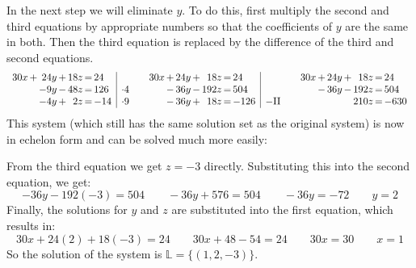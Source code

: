 \documentclass[12pt,eng]{skript_ogg}
\begin{document}
\begin{beispiel}
In the next step we will eliminate $y$. To do this, first multiply the second and third equations by appropriate numbers so that the coefficients of $y$ are the same in both. Then the third equation is replaced by the difference of the third and second equations.		
\[\begin{array}{r@{\,}c@{\,}r@{\,}c@{\,}r@{\,}c@{\,}l|l}
30x & + & 24y & + & 18z & = & 24 &\\
    &   & -9y & - & 48z & = & 126 & \cdot 4\\
    &   & -4y & + & 2z  & = & -14 & \cdot 9
\end{array}\quad\begin{array}{r@{\,}c@{\,}r@{\,}c@{\,}r@{\,}c@{\,}l|l}
30x & + & 24y & + & 18z & = & 24 &\\
    & - & 36y & - & 192z & = & 504 &\\
    & - & 36y & + & 18z & = & -126 &-\mbox{II}
\end{array}\quad\begin{array}{r@{\,}c@{\,}r@{\,}c@{\,}r@{\,}c@{\,}l}
30x & + & 24y & + & 18z & = & 24 \\
    & - & 36y & - & 192z & = & 504 \\
    &   &      &   & 210z & = & -630
\end{array}\]
This system (which still has the same solution set as the original system) is now in echelon form and can be solved much more easily:

From the third equation we get $z=-3$ directly. Substituting this into the second equation, we get:
\[-36y-192(-3)=504\qquad -36y+576=504\qquad -36y=-72\qquad y=2\]
Finally, the solutions for $y$ and $z$ are substituted into the first equation, which results in:
\[30x+24(2)+18(-3)=24\qquad 30x+48-54=24\qquad 30x=30\qquad x=1\]
So the solution of the system is $\mathbb{L}=\{(1,2,-3)\}$.
\end{beispiel}
\end{document}

